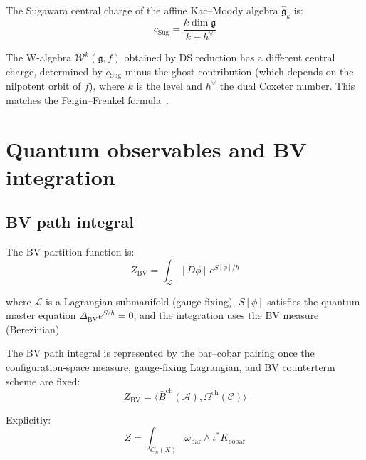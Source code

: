 \begin{theorem}
The Sugawara central charge of the affine Kac--Moody algebra $\widehat{\mathfrak{g}}_k$ is:
\[c_{\mathrm{Sug}} = \frac{k \dim \mathfrak{g}}{k + h^\vee}\]

The W-algebra $\mathcal{W}^k(\mathfrak{g}, f)$ obtained by DS reduction has a different central charge, determined by $c_{\mathrm{Sug}}$ minus the ghost contribution (which depends on the nilpotent orbit of $f$), where $k$ is the level and $h^\vee$ the dual Coxeter number. This matches the Feigin--Frenkel formula~\cite{Feigin-Frenkel}.
\end{theorem}

\section{Quantum observables and BV integration}

\subsection{BV path integral}

\begin{definition}
The BV partition function is:
\[Z_{\text{BV}} = \int_{\mathcal{L}} [D\phi] \, e^{S[\phi]/\hbar}\]

where $\mathcal{L}$ is a Lagrangian submanifold (gauge fixing), $S[\phi]$ satisfies the quantum master equation $\Delta_{\text{BV}} e^{S/\hbar} = 0$, and the integration uses the BV measure (Berezinian).
\end{definition}

\begin{remark}
The BV path integral is represented by the bar--cobar pairing once the
configuration-space measure, gauge-fixing Lagrangian, and BV
counterterm scheme are fixed:
\[Z_{\text{BV}} = \langle \bar{B}^{\text{ch}}(\mathcal{A}),
\Omega^{\text{ch}}(\mathcal{C}) \rangle\]

Explicitly:
\[Z = \int_{\overline{C}_n(X)} \omega_{\text{bar}} \wedge \iota^* K_{\text{cobar}}\]
\end{remark}

